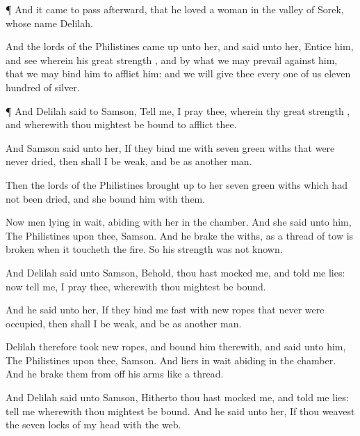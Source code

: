 {\par }{\PP {}¶ And it came to pass
afterward, that he
loved a
woman in the
valley of
Sorek, whose
name
{}
Delilah.

And the
lords of the
Philistines came
up unto her, and
said unto her,
Entice him, and
see wherein his
great
strength
{}, and by what
{} we may
prevail against him, that we may
bind him to
afflict him: and we will
give thee every
one of us eleven
hundred
{} of
silver.


\par }{\PP {}¶ And
Delilah
said to
Samson,
Tell me, I pray thee, wherein thy
great
strength
{}, and wherewith thou mightest be
bound to
afflict thee.

And
Samson
said unto her, If they
bind me with
seven
green
withs that were never
dried, then shall I be
weak, and be as
another
man.

Then the
lords of the
Philistines brought
up to her
seven
green
withs which had not been
dried, and she
bound him with them.

Now
{} men lying in
wait,
abiding with her in the
chamber. And she
said unto him, The
Philistines
{} upon thee,
Samson. And he
brake the
withs, as a
thread of
tow is
broken when it
toucheth the
fire. So his
strength was not
known.

And
Delilah
said unto
Samson, Behold, thou hast
mocked me, and
told me
lies: now
tell me, I pray thee, wherewith thou mightest be
bound.

And he
said unto her, If they
bind me
fast with
new
ropes that never were
occupied, then shall I be
weak, and be as
another
man.

Delilah therefore
took
new
ropes, and
bound him therewith, and
said unto him, The
Philistines
{} upon thee,
Samson. And
{} liers in
wait
abiding in the
chamber. And he
brake them from off his
arms like a
thread.

And
Delilah
said unto
Samson,
Hitherto thou hast
mocked me, and
told me
lies:
tell me wherewith thou mightest be
bound. And he
said unto her, If thou
weavest the
seven
locks of my
head with the
web.

}
